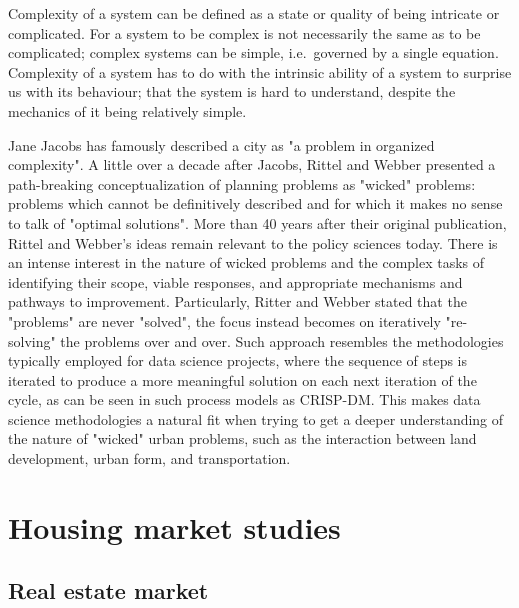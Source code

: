 Complexity of a system can be defined as a state or quality of being intricate or complicated.
For a system to be complex is not necessarily the same as to be complicated;
complex systems can be simple, i.e.\ governed by a single equation.
Complexity of a system has to do with the intrinsic ability of a system to surprise us with its behaviour;
that the system is hard to understand, despite the mechanics of it being relatively simple.

Jane Jacobs has famously described a city as "a problem in organized complexity"\cite{Jacobs1961a}.
A little over a decade after Jacobs, Rittel and Webber presented a path-breaking conceptualization of planning problems as "wicked" problems: problems which cannot be definitively described and for which it makes no sense to talk of "optimal solutions"\cite{Rittel1973}.
More than 40 years after their original publication, Rittel and Webber's ideas remain relevant to the policy sciences today.
There is an intense interest in the nature of wicked problems and the complex tasks of identifying their scope, viable responses, and appropriate mechanisms and pathways to improvement\cite{Crowley2017}.
Particularly, Ritter and Webber stated that the "problems" are never "solved", the focus instead becomes on iteratively "re-solving" the problems over and over.
Such approach resembles the methodologies typically employed for data science projects, where the sequence of steps is iterated to produce a more meaningful solution on each next iteration of the cycle, as can be seen in such process models as CRISP-DM\cite{Shearer2000}.
This makes data science methodologies a natural fit when trying to get a deeper understanding of the nature of "wicked" urban problems, such as the interaction between land development, urban form, and transportation.

\section{Housing market studies} \label{sec:housing_market_studies}

\subsection{Real estate market} \label{subsec:real_estate_market}

